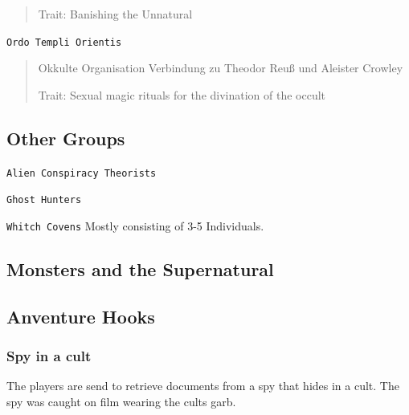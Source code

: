 \documentclass[11pt]{article}
\begin{document}
{\begin{quote}
Trait: Banishing the Unnatural
\end{quote}

\texttt{Ordo Templi Orientis}
\begin{quote}
Okkulte Organisation
Verbindung zu Theodor Reuß und Aleister Crowley

Trait: Sexual magic rituals for the divination of the occult
\end{quote}

\subsection{Other Groups}
\label{sec:orgeba3a01}
\texttt{Alien Conspiracy Theorists}

\texttt{Ghost Hunters}

\texttt{Whitch Covens}
Mostly consisting of 3-5 Individuals.

\subsection{Monsters and the Supernatural}
\label{sec:orga248ac2}

\subsection{Anventure Hooks}
\label{sec:org7af3280}
\subsubsection{Spy in a cult}
\label{sec:orgd834638}

The players are send to retrieve documents from a spy that hides in a cult. The spy was caught on film wearing the cults garb. 

}
\end{document}
